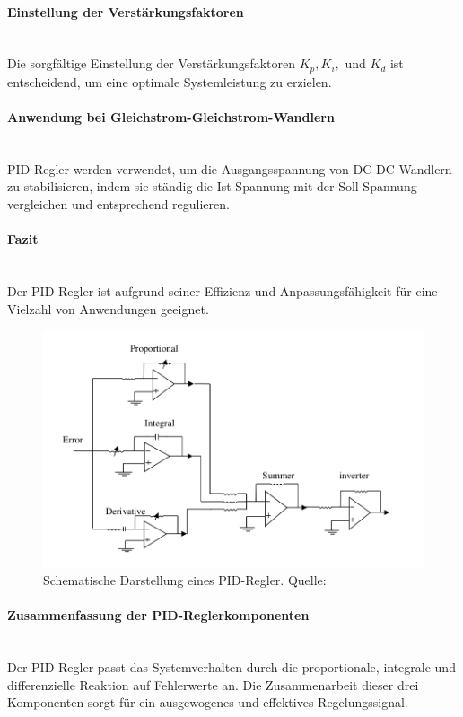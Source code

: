 \paragraph{Einstellung der Verstärkungsfaktoren} \mbox{}\\
Die sorgfältige Einstellung der Verstärkungsfaktoren \( K_p, K_i, \) und \( K_d \) ist entscheidend, um eine optimale Systemleistung zu erzielen.

\paragraph{Anwendung bei Gleichstrom-Gleichstrom-Wandlern} \mbox{}\\
PID-Regler werden verwendet, um die Ausgangsspannung von DC-DC-Wandlern zu stabilisieren, indem sie ständig die Ist-Spannung mit der Soll-Spannung vergleichen und entsprechend regulieren.
\cite{SwainBaid2014}

\paragraph{Fazit} \mbox{}\\
Der PID-Regler ist aufgrund seiner Effizienz und Anpassungsfähigkeit für eine Vielzahl von Anwendungen geeignet.

\begin{figure}[htbp]
    \centering
    \includegraphics[width=0.6\linewidth]{2Grundlagen/13PID.png}
    \caption{Schematische Darstellung eines PID-Regler. Quelle: \cite{SwainBaid2014}}
    \label{fig:PID_converter}
\end{figure}

\paragraph{Zusammenfassung der PID-Reglerkomponenten} \mbox{}\\
Der PID-Regler passt das Systemverhalten durch die proportionale, integrale und differenzielle Reaktion auf Fehlerwerte an. Die Zusammenarbeit dieser drei Komponenten sorgt für ein ausgewogenes und effektives Regelungssignal.


